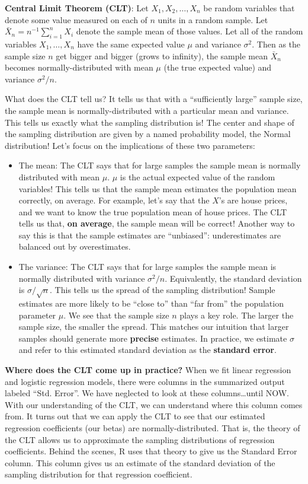 \documentclass[
]{book}
\providecommand{\tightlist}{%
  \setlength{\itemsep}{0pt}\setlength{\parskip}{0pt}}
\begin{document}
\textbf{Central Limit Theorem (CLT)}: Let \(X_1, X_2, \ldots, X_n\) be random variables that denote some value measured on each of \(n\) units in a random sample. Let \(\bar{X}_n = n^{-1}\sum_{i=1}^n X_i\) denote the sample mean of those values. Let all of the random variables \(X_1, \ldots, X_n\) have the same expected value \(\mu\) and variance \(\sigma^2\). Then as the sample size \(n\) get bigger and bigger (grows to infinity), the sample mean \(\bar{X}_n\) becomes normally-distributed with mean \(\mu\) (the true expected value) and variance \(\sigma^2/n\).

What does the CLT tell us? It tells us that with a ``sufficiently large'' sample size, the sample mean is normally-distributed with a particular mean and variance. This tells us exactly what the sampling distribution is! The center and shape of the sampling distribution are given by a named probability model, the Normal distribution! Let's focus on the implications of these two parameters:

\begin{itemize}
\tightlist
\item
  The mean: The CLT says that for large samples the sample mean is normally distributed with mean \(\mu\). \(\mu\) is the actual expected value of the random variables! This tells us that the sample mean estimates the population mean correctly, on average. For example, let's say that the \(X\)'s are house prices, and we want to know the true population mean of house prices. The CLT tells us that, \textbf{on average}, the sample mean will be correct! Another way to say this is that the sample estimates are ``unbiased'': underestimates are balanced out by overestimates.
\item
  The variance: The CLT says that for large samples the sample mean is normally distributed with variance \(\sigma^2/n\). Equivalently, the standard deviation is \(\sigma/\sqrt{n}\). This tells us the spread of the sampling distribution! Sample estimates are more likely to be ``close to'' than ``far from'' the population parameter \(\mu\). We see that the sample size \(n\) plays a key role. The larger the sample size, the smaller the spread. This matches our intuition that larger samples should generate more \textbf{precise} estimates. In practice, we estimate \(\sigma\) and refer to this estimated standard deviation as the \textbf{standard error}.
\end{itemize}

\textbf{Where does the CLT come up in practice?} When we fit linear regression and logistic regression models, there were columns in the summarized output labeled ``Std. Error''. We have neglected to look at these columns\ldots until NOW. With our understanding of the CLT, we can understand where this column comes from. It turns out that we can apply the CLT to see that our estimated regression coefficients (our betas) are normally-distributed. That is, the theory of the CLT allows us to approximate the sampling distributions of regression coefficients. Behind the scenes, R uses that theory to give us the Standard Error column. This column gives us an estimate of the standard deviation of the sampling distribution for that regression coefficient.
\end{document}
